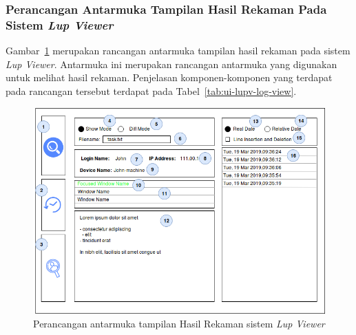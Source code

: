 \subsubsection{Perancangan Antarmuka Tampilan Hasil Rekaman Pada Sistem \emph{Lup Viewer}}

Gambar~\ref{fig:ui-lupv-log-view} merupakan rancangan antarmuka
tampilan hasil rekaman pada sistem \emph{Lup Viewer}. Antarmuka ini
merupakan rancangan antarmuka yang digunakan untuk melihat hasil
rekaman. Penjelasan komponen-komponen yang terdapat pada rancangan
tersebut terdapat pada Tabel~\ref{tab:ui-lupv-log-view}.

\begin{figure}[H]
  \centering
  \includegraphics[width=.8\linewidth]{img/ui/ui-lupv-log-view}
  \caption{Perancangan antarmuka tampilan Hasil Rekaman sistem \emph{Lup
      Viewer}}\label{fig:ui-lupv-log-view}
\end{figure}

